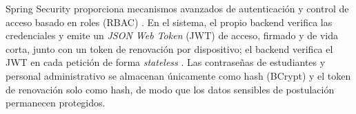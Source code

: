 Spring Security proporciona mecanismos avanzados de autenticación y control de acceso basado en roles (RBAC) \parencite{mularien2010springsecurity}. En el sistema, el propio backend verifica las credenciales y emite un \textit{JSON Web Token} (JWT) de acceso, firmado y de vida corta, junto con un token de renovación por dispositivo; el backend verifica el JWT en cada petición de forma \textit{stateless} \parencite{jones2015jwt}. Las contraseñas de estudiantes y personal administrativo se almacenan únicamente como hash (BCrypt) y el token de renovación solo como hash, de modo que los datos sensibles de postulación permanecen protegidos.
